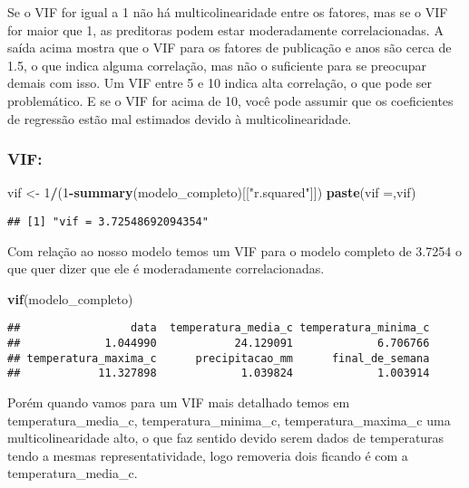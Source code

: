 \documentclass[
]{article}
\newenvironment{Shaded}{\begin{snugshade}}{\end{snugshade}}
\newcommand{\DecValTok}[1]{\textcolor[rgb]{0.00,0.00,0.81}{#1}}
\newcommand{\FunctionTok}[1]{\textcolor[rgb]{0.13,0.29,0.53}{\textbf{#1}}}
\newcommand{\NormalTok}[1]{#1}
\newcommand{\OtherTok}[1]{\textcolor[rgb]{0.56,0.35,0.01}{#1}}
\newcommand{\SpecialCharTok}[1]{\textcolor[rgb]{0.81,0.36,0.00}{\textbf{#1}}}
\newcommand{\StringTok}[1]{\textcolor[rgb]{0.31,0.60,0.02}{#1}}
\begin{document}
Se o VIF for igual a 1 não há multicolinearidade entre os fatores, mas
se o VIF for maior que 1, as preditoras podem estar moderadamente
correlacionadas. A saída acima mostra que o VIF para os fatores de
publicação e anos são cerca de 1.5, o que indica alguma correlação, mas
não o suficiente para se preocupar demais com isso. Um VIF entre 5 e 10
indica alta correlação, o que pode ser problemático. E se o VIF for
acima de 10, você pode assumir que os coeficientes de regressão estão
mal estimados devido à multicolinearidade.

\hypertarget{vif}{%
\subsubsection{VIF:}\label{vif}}

\begin{Shaded}
\begin{Highlighting}[]
\NormalTok{vif }\OtherTok{\textless{}{-}} \DecValTok{1}\SpecialCharTok{/}\NormalTok{(}\DecValTok{1}\SpecialCharTok{{-}}\FunctionTok{summary}\NormalTok{(modelo\_completo)[[}\StringTok{"r.squared"}\NormalTok{]])}
\FunctionTok{paste}\NormalTok{(}\StringTok{\textquotesingle{}vif =\textquotesingle{}}\NormalTok{,vif)}
\end{Highlighting}
\end{Shaded}

\begin{verbatim}
## [1] "vif = 3.72548692094354"
\end{verbatim}

Com relação ao nosso modelo temos um VIF para o modelo completo de
3.7254 o que quer dizer que ele é moderadamente correlacionadas.

\begin{Shaded}
\begin{Highlighting}[]
\FunctionTok{vif}\NormalTok{(modelo\_completo)}
\end{Highlighting}
\end{Shaded}

\begin{verbatim}
##                 data  temperatura_media_c temperatura_minima_c 
##             1.044990            24.129091             6.706766 
## temperatura_maxima_c      precipitacao_mm      final_de_semana 
##            11.327898             1.039824             1.003914
\end{verbatim}

Porém quando vamos para um VIF mais detalhado temos em
temperatura\_media\_c, temperatura\_minima\_c, temperatura\_maxima\_c
uma multicolinearidade alto, o que faz sentido devido serem dados de
temperaturas tendo a mesmas representatividade, logo removeria dois
ficando é com a temperatura\_media\_c.
\end{document}
